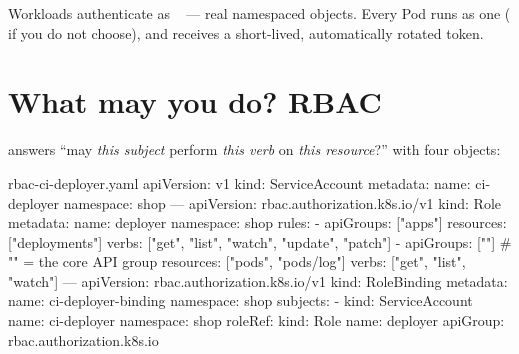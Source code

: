 Workloads authenticate as ~ --- real
namespaced objects. Every Pod runs as one ( if you do not choose),
and receives a short-lived, automatically rotated token.

\section{What may you do? RBAC}

 answers ``may \emph{this subject} perform
\emph{this verb} on \emph{this resource}?'' with four objects:

\begin{center}
\end{center}

\begin{yamlcode}{rbac-ci-deployer.yaml}
apiVersion: v1
kind: ServiceAccount
metadata:
  name: ci-deployer
  namespace: shop
---
apiVersion: rbac.authorization.k8s.io/v1
kind: Role
metadata:
  name: deployer
  namespace: shop
rules:
  - apiGroups: ["apps"]
    resources: ["deployments"]
    verbs: ["get", "list", "watch", "update", "patch"]
  - apiGroups: [""]                     # "" = the core API group
    resources: ["pods", "pods/log"]
    verbs: ["get", "list", "watch"]
---
apiVersion: rbac.authorization.k8s.io/v1
kind: RoleBinding
metadata:
  name: ci-deployer-binding
  namespace: shop
subjects:
  - kind: ServiceAccount
    name: ci-deployer
    namespace: shop
roleRef:
  kind: Role
  name: deployer
  apiGroup: rbac.authorization.k8s.io
\end{yamlcode}


